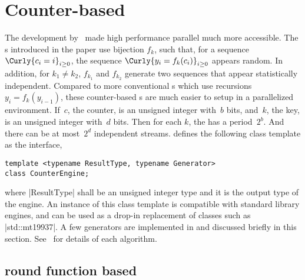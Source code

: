 \section{Counter-based \texorpdfstring{\rng}{RNG}}
\label{sec:Counter-based RNG}

The development by~\cite{Salmon:2011um} made high performance parallel \rng
much more accessible. The \rng{}s introduced in the paper use bijection $f_k$,
such that, for a sequence $\Curly{c_i = i}_{i\ge0}$, the sequence $\Curly{y_i =
  f_k(c_i)}_{i\ge0}$ appears random. In addition, for $k_1 \ne k_2$, $f_{k_1}$
and $f_{k_2}$ generate two sequences that appear statistically independent.
Compared to more conventional \rng{}s which use recursions $y_i = f_k(y_{i -
  1})$, these counter-based \rng{}s are much easier to setup in a parallelized
environment. If~$c$, the counter, is an unsigned integer with~$b$ bits,
and~$k$, the key, is an unsigned integer with~$d$ bits. Then for each $k$, the
\rng has a period~$2^b$. And there can be at most~$2^d$ independent streams.
\mckl defines the following class template as the interface,
\begin{verbatim}
template <typename ResultType, typename Generator>
class CounterEngine;
\end{verbatim}
where |ResultType| shall be an unsigned integer type and it is the output type
of the \rng engine. An instance of this class template is compatible with
standard library \rng engines, and can be used as a drop-in replacement of
classes such as |std::mt19937|. A few generators are implemented in \mckl and
discussed briefly in this section. See~\cite{Salmon:2011um} for details of each
algorithm.

\subsection{\texorpdfstring{\aes}{AES} round function based
\texorpdfstring{\rng}{RNG}}
\label{sub:AES round function based RNG}

